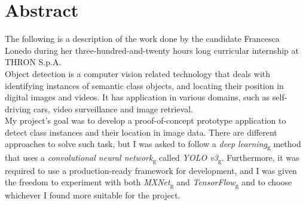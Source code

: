 
\cleardoublepage
{}
{}
\begingroup
\let\clearpage\relax
\let\cleardoublepage\relax
\let\cleardoublepage\relax
{}


\chapter*{Abstract}
The following is a description of the work done by the candidate Francesca Lonedo during her three-hundred-and-twenty hours long curricular internship at THRON S.p.A. \\
Object detection is a computer vision related technology that deals with identifying instances of semantic class objects, and locating their position in digital images and videos. 
It has application in various domains, such as self-driving cars, video surveillance and image retrieval. \\
My project's goal was to develop a proof-of-concept prototype application to detect class instances and their location in image data. There are different approaches to solve such task, but I was asked to follow a \emph{\gls{deep learning}}\textsubscript{g} method that uses a \emph{\gls{convolutional neural network}}\textsubscript{g} called \emph{\gls{YOLO v3}}\textsubscript{g}. Furthermore, it was required to use a production-ready framework for development, and I was given the freedom to experiment with both \emph{\gls{MXNet}}\textsubscript{g} and \emph{\gls{TensorFlow}}\textsubscript{g} and to choose whichever I found more suitable for the project. \\



%

%


\endgroup			

\vfill

